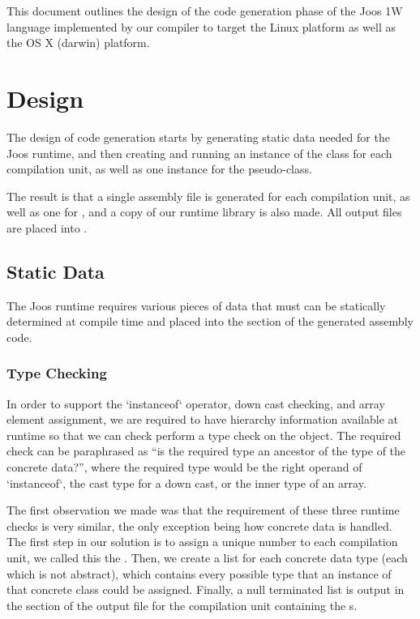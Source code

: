 \documentclass[pdftex,11pt,a4paper]{article}
\begin{document}

This document outlines the design of the code generation phase of
the Joos 1W language implemented by our compiler to target the
 Linux platform as well as the  OS X (darwin)
platform.


\section{Design}

The design of code generation starts by generating static data needed
for the Joos runtime, and then creating and running an instance of the
 class for each compilation unit, as well as one
instance for the  pseudo-class.

The result is that a single assembly file is generated for each
compilation unit, as well as one for , and a copy of our
runtime library is also made. All output files are placed into
.


\subsection{Static Data}

The Joos runtime requires various pieces of data that must can be
statically determined at compile time and placed into the 
section of the generated assembly code.

\subsubsection{Type Checking}

In order to support the `instanceof` operator, down cast checking, and
array element assignment, we are required to have hierarchy information
available at runtime so that we can check perform a type check on the
object. The required check can be paraphrased as ``is the required
type an ancestor of the type of the concrete data?'', where the
required type would be the right operand of `instanceof`, the cast
type for a down cast, or the inner type of an array.

The first observation we made was that the requirement of these three
runtime checks is very similar, the only exception being how
 concrete data is handled. The first step in our solution is
to assign a unique number to each compilation unit, we called this the
. Then, we create a list for each concrete data
type (each  which is not abstract), which contains every
possible type that an instance of that concrete class could be
assigned. Finally, a null terminated list is output in the 
section of the output file for the compilation unit containing the
s.
\end{document}
